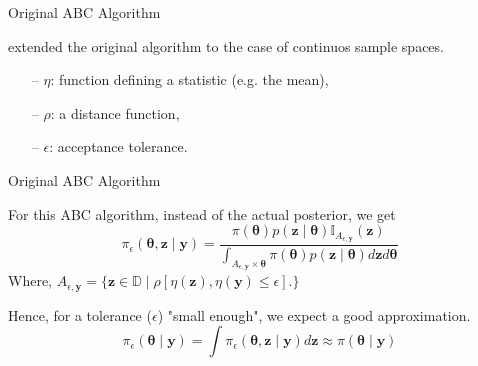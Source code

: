 \documentclass[10pt]{beamer}
\begin{document}
\begin{frame}[fragile]{Original ABC Algorithm}

  \citet{Pritchard1999} extended the original algorithm to the case
  of continuos sample spaces.

  \vspace{0.3cm}

\begin{algorithm}[H]
\SetAlgoLined
{}
 \caption{ABC method for discrete and continuous distributions}
\end{algorithm}
\begin{itemize}
  \item[--] $\eta$: function defining a statistic (e.g. the mean),
  \item[--] $\rho$: a distance function,
  \item[--] $\epsilon$: acceptance tolerance.
\end{itemize}

\end{frame}

\begin{frame}[fragile]{Original ABC Algorithm}

  For this ABC algorithm, instead of the actual posterior,
  we get
  $$
  \pi_\epsilon(\bm \theta, \bm z \mid \bm y) = 
  \frac{\pi(\bm \theta) p(\bm z \mid \bm \theta)
  \mathbb I_{A_{\epsilon,\bm y}}(\bm z)}
  {\int_{A_{\epsilon,\bm y}\times \bm\theta}\pi(\bm \theta)
  p(\bm z \mid \bm \theta)d\bm z d \bm \theta}
  $$
  Where, $A_{\epsilon,\bm y} = \{
  \bm z \in \mathbb D \mid \rho[\eta(\bm z), \eta(\bm y) \leq \epsilon].
  \}$

  Hence, for a tolerance ($\epsilon$) "small enough", we expect a good
  approximation.
  $$\pi_\epsilon(\bm \theta \mid \bm y) = 
  \int \pi_\epsilon(\bm \theta, \bm z \mid \bm y) d \bm z \approx
  \pi(\bm \theta \mid \bm y)$$

\end{frame}

\AtBeginSection{}
\end{document}
